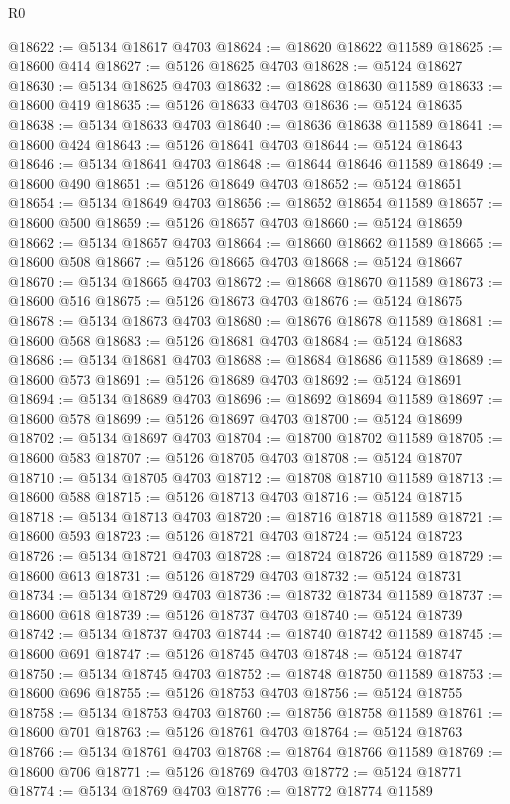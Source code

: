 \begin{lexlean}{R0}
\begin{coremodule}
@18622 := @5134 @18617 @4703
@18624 := @18620 @18622 @11589
@18625 := @18600 @414
@18627 := @5126 @18625 @4703
@18628 := @5124 @18627
@18630 := @5134 @18625 @4703
@18632 := @18628 @18630 @11589
@18633 := @18600 @419
@18635 := @5126 @18633 @4703
@18636 := @5124 @18635
@18638 := @5134 @18633 @4703
@18640 := @18636 @18638 @11589
@18641 := @18600 @424
@18643 := @5126 @18641 @4703
@18644 := @5124 @18643
@18646 := @5134 @18641 @4703
@18648 := @18644 @18646 @11589
@18649 := @18600 @490
@18651 := @5126 @18649 @4703
@18652 := @5124 @18651
@18654 := @5134 @18649 @4703
@18656 := @18652 @18654 @11589
@18657 := @18600 @500
@18659 := @5126 @18657 @4703
@18660 := @5124 @18659
@18662 := @5134 @18657 @4703
@18664 := @18660 @18662 @11589
@18665 := @18600 @508
@18667 := @5126 @18665 @4703
@18668 := @5124 @18667
@18670 := @5134 @18665 @4703
@18672 := @18668 @18670 @11589
@18673 := @18600 @516
@18675 := @5126 @18673 @4703
@18676 := @5124 @18675
@18678 := @5134 @18673 @4703
@18680 := @18676 @18678 @11589
@18681 := @18600 @568
@18683 := @5126 @18681 @4703
@18684 := @5124 @18683
@18686 := @5134 @18681 @4703
@18688 := @18684 @18686 @11589
@18689 := @18600 @573
@18691 := @5126 @18689 @4703
@18692 := @5124 @18691
@18694 := @5134 @18689 @4703
@18696 := @18692 @18694 @11589
@18697 := @18600 @578
@18699 := @5126 @18697 @4703
@18700 := @5124 @18699
@18702 := @5134 @18697 @4703
@18704 := @18700 @18702 @11589
@18705 := @18600 @583
@18707 := @5126 @18705 @4703
@18708 := @5124 @18707
@18710 := @5134 @18705 @4703
@18712 := @18708 @18710 @11589
@18713 := @18600 @588
@18715 := @5126 @18713 @4703
@18716 := @5124 @18715
@18718 := @5134 @18713 @4703
@18720 := @18716 @18718 @11589
@18721 := @18600 @593
@18723 := @5126 @18721 @4703
@18724 := @5124 @18723
@18726 := @5134 @18721 @4703
@18728 := @18724 @18726 @11589
@18729 := @18600 @613
@18731 := @5126 @18729 @4703
@18732 := @5124 @18731
@18734 := @5134 @18729 @4703
@18736 := @18732 @18734 @11589
@18737 := @18600 @618
@18739 := @5126 @18737 @4703
@18740 := @5124 @18739
@18742 := @5134 @18737 @4703
@18744 := @18740 @18742 @11589
@18745 := @18600 @691
@18747 := @5126 @18745 @4703
@18748 := @5124 @18747
@18750 := @5134 @18745 @4703
@18752 := @18748 @18750 @11589
@18753 := @18600 @696
@18755 := @5126 @18753 @4703
@18756 := @5124 @18755
@18758 := @5134 @18753 @4703
@18760 := @18756 @18758 @11589
@18761 := @18600 @701
@18763 := @5126 @18761 @4703
@18764 := @5124 @18763
@18766 := @5134 @18761 @4703
@18768 := @18764 @18766 @11589
@18769 := @18600 @706
@18771 := @5126 @18769 @4703
@18772 := @5124 @18771
@18774 := @5134 @18769 @4703
@18776 := @18772 @18774 @11589

\end{coremodule}
\end{lexlean}
